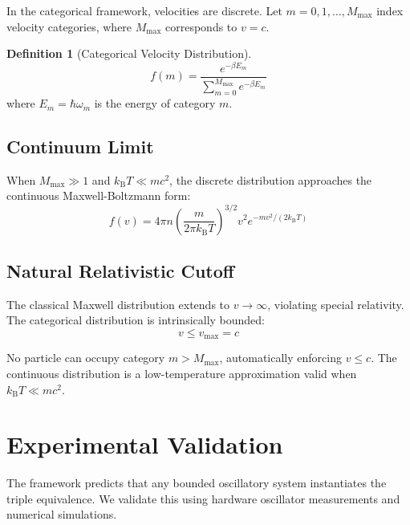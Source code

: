 \documentclass[twocolumn,10pt]{article}
\theoremstyle{definition}
\newtheorem{definition}[theorem]{Definition}
\theoremstyle{remark}
\newcommand{\kB}{k_{\mathrm{B}}}
\begin{document}
In the categorical framework, velocities are discrete. Let $m = 0, 1, \ldots, M_{\max}$ index velocity categories, where $M_{\max}$ corresponds to $v = c$.

\begin{definition}[Categorical Velocity Distribution]
\begin{equation}
f(m) = \frac{e^{-\beta E_m}}{\sum_{m=0}^{M_{\max}} e^{-\beta E_m}}
\label{eq:categorical_maxwell}
\end{equation}
where $E_m = \hbar\omega_m$ is the energy of category $m$.
\end{definition}

\subsection{Continuum Limit}

When $M_{\max} \gg 1$ and $\kB T \ll mc^2$, the discrete distribution approaches the continuous Maxwell-Boltzmann form:
\begin{equation}
f(v) = 4\pi n \left(\frac{m}{2\pi\kB T}\right)^{3/2} v^2 e^{-mv^2/(2\kB T)}
\label{eq:maxwell_continuum}
\end{equation}

\subsection{Natural Relativistic Cutoff}

The classical Maxwell distribution extends to $v \to \infty$, violating special relativity. The categorical distribution is intrinsically bounded:
\begin{equation}
v \leq v_{\max} = c
\end{equation}

No particle can occupy category $m > M_{\max}$, automatically enforcing $v \leq c$. The continuous distribution is a low-temperature approximation valid when $\kB T \ll mc^2$.

\section{Experimental Validation}
\label{sec:validation}

The framework predicts that any bounded oscillatory system instantiates the triple equivalence. We validate this using hardware oscillator measurements and numerical simulations.
\end{document}
